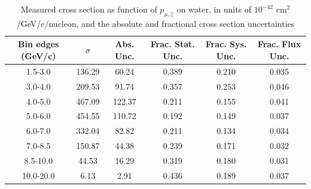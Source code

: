 \documentclass[../main.tex]{subfiles}
\begin{document}
\pagebreak
\begin{turnpage}
\end{turnpage}
\begin{table}
  \centering
  \renewcommand{\arraystretch}{1.15}
  \caption{Measured cross section as function of $p_{\mu,||}$ on water, in units of $10^{-42}$ $\text{cm}^2$/GeV/c/nucleon, and the absolute and fractional cross section uncertainties}
    \begin{tabular}{c||c|c||c|c|c}
      Bin edges (GeV/c) &  $\sigma$  &  Abs. Unc.  &  Frac. Stat. Unc.  &  Frac. Sys. Unc.  &  Frac. Flux Unc. \\
      \hline
      \hline
      1.5-3.0 & 136.29 & 60.24 & 0.389 & 0.210 & 0.035\\
      3.0-4.0 & 209.53 & 91.74 & 0.357 & 0.253 & 0.046\\
      4.0-5.0 & 467.09 & 122.37 & 0.211 & 0.155 & 0.041\\
      5.0-6.0 & 454.55 & 110.72 & 0.192 & 0.149 & 0.037\\
      6.0-7.0 & 332.04 & 82.82 & 0.211 & 0.134 & 0.034\\
      7.0-8.5 & 150.87 & 44.38 & 0.239 & 0.171 & 0.032\\
      8.5-10.0 & 44.53 & 16.29 & 0.319 & 0.180 & 0.031\\
      10.0-20.0 & 6.13 & 2.91 & 0.436 & 0.189 & 0.037
    \end{tabular}
  \label{tbl:datanucleonnuc10muon_pza}
\end{table}
\begin{table}
  \centering
  \renewcommand{\arraystretch}{1.15}
  \caption{Statistical covariance matrix of measured cross section as function of $p_{\mu,||}$ on water, in units of $10^{-84}$ $(\text{cm}^2$/GeV/c/nucleon$)^2$}
  \label{tbl:statnucleonnuc10muon_pzb}
\end{table}
\end{document}
